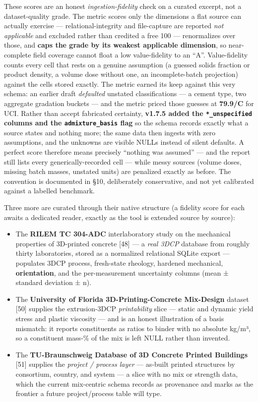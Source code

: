 \documentclass[
  11pt,
  letterpaper,
]{article}
\providecommand{\tightlist}{%
  \setlength{\itemsep}{0pt}\setlength{\parskip}{0pt}}
\begin{document}
These scores are an honest \emph{ingestion-fidelity} check on a curated
excerpt, not a dataset-quality grade. The metric scores only the
dimensions a flat source can actually exercise --- relational-integrity
and file-capture are reported \emph{not applicable} and excluded rather
than credited a free 100 --- renormalizes over those, and \textbf{caps
the grade by its weakest applicable dimension}, so near-complete field
coverage cannot float a low value-fidelity to an ``A''. Value-fidelity
counts every cell that rests on a genuine assumption (a guessed solids
fraction or product density, a volume dose without one, an
incomplete-batch projection) against the cells stored exactly. The
metric earned its keep against this very schema: an earlier draft
\emph{defaulted} unstated classifications --- a cement type, two
aggregate gradation buckets --- and the metric priced those guesses at
\textbf{79.9/C} for UCI. Rather than accept fabricated certainty,
\textbf{v1.7.5 added the \texttt{*\_unspecified} columns and the
\texttt{admixture\_basis} flag} so the schema records exactly what a
source states and nothing more; the same data then ingests with zero
assumptions, and the unknowns are visible NULLs instead of silent
defaults. A perfect score therefore means precisely ``nothing was
assumed'' --- and the report still lists every generically-recorded cell
--- while messy sources (volume doses, missing batch masses, unstated
units) are penalized exactly as before. The convention is documented in
§10, deliberately conservative, and not yet calibrated against a
labelled benchmark.

Three more are curated through their native structure (a fidelity score
for each awaits a dedicated reader, exactly as the tool is extended
source by source):

\begin{itemize}
\tightlist
\item
  The \textbf{RILEM TC 304-ADC} interlaboratory study on the mechanical
  properties of 3D-printed concrete {[}48{]} --- a \emph{real 3DCP}
  database from roughly thirty laboratories, stored as a normalized
  relational SQLite export --- populates 3DCP process, fresh-state
  rheology, hardened mechanical, \textbf{orientation}, and the
  per-measurement uncertainty columns (mean ± standard deviation ± n).
\item
  The \textbf{University of Florida 3D-Printing-Concrete Mix-Design}
  dataset {[}50{]} supplies the extrusion-3DCP \emph{printability} slice
  --- static and dynamic yield stress and plastic viscosity --- and is
  an honest illustration of a basis mismatch: it reports constituents as
  ratios to binder with no absolute kg/m³, so a constituent mass-\% of
  the mix is left NULL rather than invented.
\item
  The \textbf{TU-Braunschweig Database of 3D Concrete Printed Buildings}
  {[}51{]} supplies the \emph{project / process layer} --- as-built
  printed structures by consortium, country, and system --- a slice with
  no mix or strength data, which the current mix-centric schema records
  as provenance and marks as the frontier a future project/process table
  will type.
\end{itemize}
\end{document}
